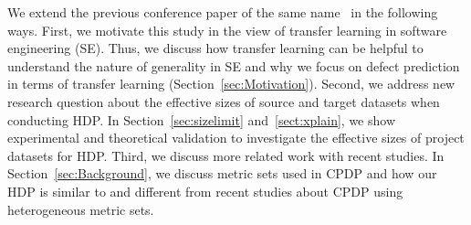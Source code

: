 We extend the previous conference paper of the same name~\cite{Nam15HDP} in the following ways. First, we motivate this study in the view of transfer learning in software engineering (SE). Thus, we discuss how transfer learning can be helpful to understand the nature of generality in SE and why we focus on defect prediction in terms of transfer learning (Section~\ref{sec:Motivation}). Second, we address new research question about the effective sizes of source and target datasets when conducting HDP.  In Section~\ref{sec:sizelimit} and~\ref{sect:xplain}, we show experimental and theoretical validation to investigate the effective sizes of project datasets for HDP. Third, we discuss more related work with recent studies. In Section~\ref{sec:Background}, we discuss metric sets used in CPDP and how our HDP is similar to and different from recent studies about CPDP using heterogeneous metric sets.



